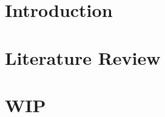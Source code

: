\documentclass{newrucsthesis}
\begin{document}


\tableofcontents
\printglossaries


\chapter{Introduction}


\chapter{Literature Review}






\chapter{WIP}








\end{document}
